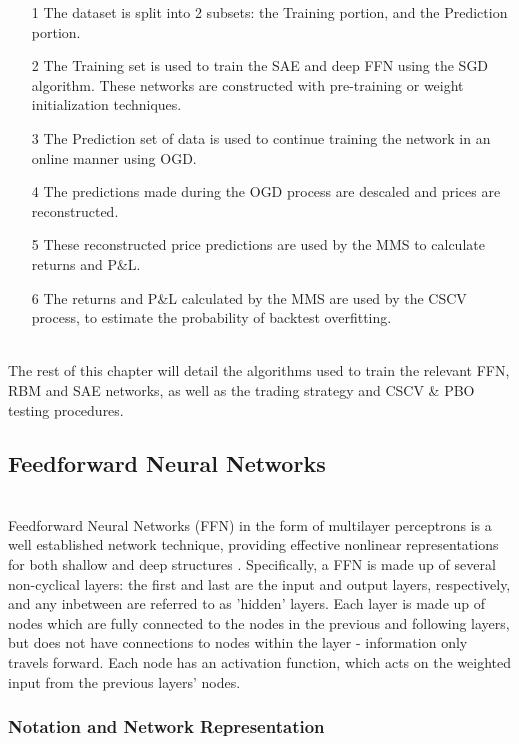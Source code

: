 \documentclass[a4paper,latin]{paper}
\begin{document}
\begin{itemize}
	\item [1] The dataset is split into 2 subsets: the Training portion, and the Prediction portion.
	\item [2] The Training set is used to train the SAE and deep FFN using the SGD algorithm. These networks are constructed with pre-training or weight initialization techniques.
	\item [3] The Prediction set of data is used to continue training the network in an online manner using OGD.
	\item [4] The predictions made during the OGD process are descaled and prices are reconstructed.
	\item [5] These reconstructed price predictions are used by the MMS to calculate returns and P\&L.
	\item [6] The returns and P\&L calculated by the MMS are used by the CSCV process, to estimate the probability of backtest overfitting.
\end{itemize}
~\\
The rest of this chapter will detail the algorithms used to train the relevant FFN, RBM and SAE networks, as well as the trading strategy and CSCV \& PBO testing procedures.

\subsection{Feedforward Neural Networks}\label{imp_ffn}
~\\
Feedforward Neural Networks (FFN) in the form of multilayer perceptrons is a well established network technique, providing effective nonlinear representations for both shallow and deep structures \cite{Schmidhuber}. Specifically, a FFN is made up of several non-cyclical layers: the first and last are the input and output layers, respectively, and any inbetween are referred to as 'hidden' layers. Each layer is made up of nodes which are fully connected to the nodes in the previous and following layers, but does not have connections to nodes within the layer - information only travels forward. Each 
node has an activation function, which acts on the weighted input from the previous layers' nodes.

\subsubsection{Notation and Network Representation}\label{imp_ffn_functions}
\end{document}
